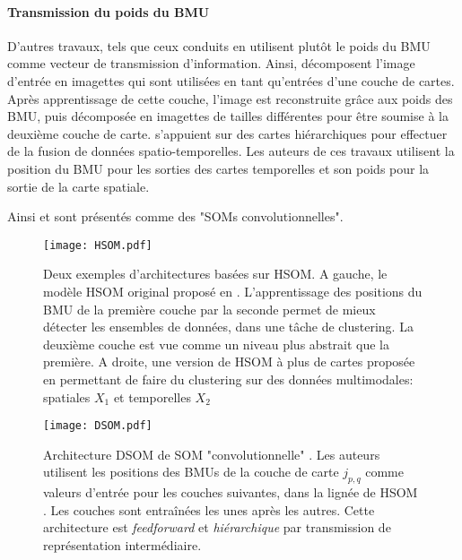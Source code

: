 \documentclass[../main]{subfiles}
\begin{document}
\paragraph*{Transmission du poids du BMU}

D'autres travaux, tels que ceux conduits en \cite{wang_comparisonal_2007, gunes_kayacik_hierarchical_2007} utilisent plutôt le poids du BMU comme  vecteur de transmission d'information.
Ainsi, \cite{dozono_convolutional_2016} décomposent l'image d'entrée en imagettes qui sont utilisées en tant qu'entrées d'une couche de cartes. Après apprentissage de cette couche, l'image est reconstruite grâce aux poids des BMU, puis décomposée en imagettes de tailles différentes pour être soumise à la deuxième couche de carte.
\cite{mici_self-organizing_2018} s'appuient sur des cartes hiérarchiques pour effectuer de la fusion de données spatio-temporelles. Les auteurs de ces travaux utilisent la position du BMU pour les sorties des cartes temporelles et son poids pour la sortie de la carte spatiale.

Ainsi \cite{hankins_somnet_2018,aly_deep_2020,sakkari_convolutional_2020,dozono_convolutional_2016,nawaratne_hierarchical_2020-1,mici_self-organizing_2018} et sont présentés comme des "SOMs convolutionnelles".

\begin{figure}
    \centering
    \texttt{[image: HSOM.pdf]}
    \caption{Deux exemples d'architectures basées sur HSOM. A gauche, le modèle HSOM original proposé en \cite{lampinen_clustering_1992}. L'apprentissage des positions du BMU de la première couche par la seconde permet de mieux détecter les ensembles de données, dans une tâche de clustering. La deuxième couche est vue comme un niveau plus abstrait que la première. A droite, une version de HSOM à plus de cartes proposée en \cite{hagenauer_hierarchical_2013} permettant de faire du clustering sur des données multimodales: spatiales $X_1$ et temporelles $X_2$
    \label{fig:hsom}}
\end{figure}

\begin{figure}
    \texttt{[image: DSOM.pdf]}
    \caption{Architecture DSOM de SOM "convolutionnelle" \cite{liu_deep_2015}. Les auteurs utilisent les positions des BMUs de la couche de carte $j_{p,q}$ comme valeurs d'entrée pour les couches suivantes, dans la lignée de HSOM \cite{lampinen_clustering_1992}. Les couches sont entraînées les unes après les autres. Cette architecture est \emph{feedforward} et \emph{hiérarchique} par transmission de représentation intermédiaire. \label{fig:dsom}}
\end{figure}
\end{document}
